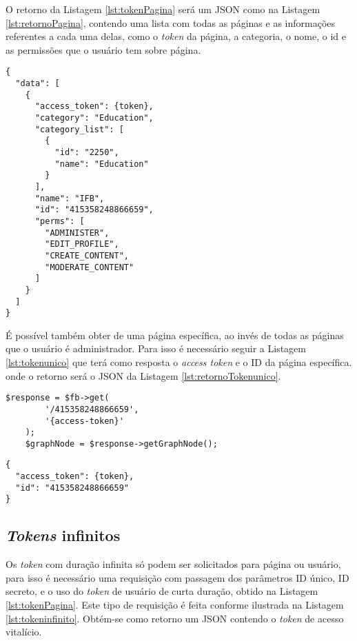 O retorno da Listagem \ref{lst:tokenPagina} será um JSON como na Listagem \ref{lst:retornoPagina}, contendo uma lista com todas as páginas e as informações referentes a cada uma delas, como o \textit{token} da página, a categoria, o nome, o id e as permissões que o usuário tem sobre página. 

\begin{lstlisting}[caption={Retorno \textit{token de acesso de página \ref{lst:tokenPagina}}},label={lst:retornoPagina}]
{
  "data": [
    {
      "access_token": {token},
      "category": "Education",
      "category_list": [
        {
          "id": "2250",
          "name": "Education"
        }
      ],
      "name": "IFB",
      "id": "415358248866659",
      "perms": [
        "ADMINISTER",
        "EDIT_PROFILE",
        "CREATE_CONTENT",
        "MODERATE_CONTENT"
      ]
    }
  ]
}
\end{lstlisting}

É possível também obter de uma página específica, ao invés de todas as páginas que o usuário é administrador. Para isso é necessário seguir a Listagem \ref{lst:tokenunico} que terá como resposta o \textit{access token} e o ID da página específica. onde o retorno será o JSON da Listagem \ref{lst:retornoTokenunico}.

\begin{lstlisting}[caption={Obtendo Token de uma única página},label={lst:tokenunico}]
    $response = $fb->get(
        '/415358248866659',
        '{access-token}'
    );
    $graphNode = $response->getGraphNode();
\end{lstlisting}

\begin{lstlisting}[caption={Retorno \textit{token} de uma única página específica},label={lst:retornoTokenunico}]
{
  "access_token": {token},
  "id": "415358248866659"
}
\end{lstlisting}


\subsection{\textit{Tokens} infinitos}
Os \textit{token} com duração infinita só podem ser solicitados para página ou usuário, para isso é necessário uma requisição com passagem dos parâmetros ID único, ID secreto, e o uso do \textit{token} de usuário de curta duração, obtido na Listagem \ref{lst:tokenPagina}. Este tipo de requisição é feita conforme ilustrada na Listagem \ref{lst:tokeninfinito}. Obtém-se como retorno um JSON contendo o \textit{token} de acesso vitalício.

